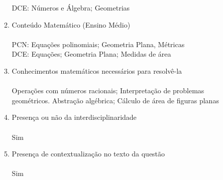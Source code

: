 \documentclass[a4paper, 12pt]{article}
\begin{document}
\begin{enumerate}
\begin{enumerate}
    DCE: Números e Álgebra; Geometrias
  \item Conteúdo Matemático (Ensino Médio) \\\\
    PCN: Equações polinomiais; Geometria Plana, Métricas\\
    DCE: Equações; Geometria Plana; Medidas de área
  \item Conhecimentos matemáticos necessários para resolvê-la \\\\
    Operações com números racionais; Interpretação de problemas geométricos. Abstração algébrica; Cálculo de área de figuras planas    
  \item Presença ou não da interdisciplinaridade \\\\
    Sim
  \item Presença de contextualização no texto da questão\\\\
    Sim
  \end{enumerate}
\end{enumerate}
\end{document}
